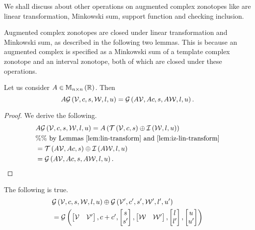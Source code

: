 We shall discuss about other operations on augmented complex zonotopes
like are linear transformation, Minkowski sum, support function and
checking inclusion.

Augmented complex zonotopes are closed under linear transformation and
Minkowski sum, as described in the following two lemmas.  This
is because an augmented complex is specified as a Minkowski sum of a template
complex zonotope and an interval zonotope, both of which are closed
under these operations.
%
\begin{lemma}
Let us consider $A\in\mathbb{M}_{n\times n}\left(\mathbb{R}\right)$.  Then
%
\[
A\mathcal{G}\left(\mathcal{V},c,s,\mathcal{W},l,u\right)=\mathcal{G}\left(A\mathcal{V},Ac,s,A\mathcal{W},l,u\right).
\]
%
\end{lemma}
%
\begin{proof}
  We derive the following.
  \begin{align*}
    & A\mathcal{G}\left(\mathcal{V},c,s,\mathcal{W},l,u\right)=
    A\left(\mathit{\operatorname{\mathcal{T}}}\left(\mathcal{V},c,s\right)\oplus \mathit{\operatorname{\mathcal{I}}}\left(\mathcal{W},l,u\right)\right)\\
    & \%\%~\text{by Lemmas~\ref{lem:lin-transform} and~\ref{lem:iz-lin-transform}}\\
    &
    = \mathit{\operatorname{\mathcal{T}}}\left(A\mathcal{V},Ac,s\right)\oplus \mathit{\operatorname{\mathcal{I}}}\left(A\mathcal{W},l,u\right)\\
    & = \mathcal{G}\left(A\mathcal{V},Ac,s,A\mathcal{W},l,u\right).~~~~~~~~~~~~~\qedhere
  \end{align*}
\end{proof}
%
\begin{lemma}
The following is true.
%
\begin{align*}
& \mathcal{G}\left(\mathcal{V},c,s,\mathcal{W},l,u\right)\oplus \mathcal{G}\left(\mathcal{V}^\prime,c^\prime,s^\prime,\mathcal{W}^\prime,l^\prime,u^\prime\right)\\
& = \mathcal{G}\left(\left[\begin{matrix}
    \mathcal{V} &
    \mathcal{V}^\prime
  \end{matrix}\right]
,\begin{matrix}
    c+c^\prime
  \end{matrix}
,\left[\begin{matrix}
    s\\
    s^\prime
  \end{matrix}\right]
,\left[\begin{matrix}
    \mathcal{W} &
    \mathcal{W}^\prime
  \end{matrix}\right]
,\left[\begin{matrix}
    l\\
    l^\prime
  \end{matrix}\right]
,\left[\begin{matrix}
    u\\
    u^\prime
  \end{matrix}\right]
\right)
\end{align*}
%
\end{lemma}
